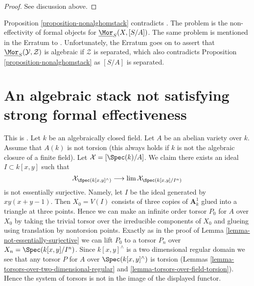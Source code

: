 \begin{proof}
See discussion above.
\end{proof}

\begin{remark}
\label{remark-contradict-aoki}
Proposition \ref{proposition-nonalghomstack} contradicts
\cite[Theorem 1.1]{AokiHomStacks}. The problem is the non-effectivity
of formal objects for $\underline{\Mor}_S(X, [S/A])$. The same problem
is mentioned in the Erratum \cite{AokiHomStacksErr} to
\cite{AokiHomStacks}. Unfortunately, the Erratum goes on
to assert that $\underline{\Mor}_S(\mathcal{Y}, \mathcal{Z})$
is algebraic if $\mathcal{Z}$ is separated, which also contradicts
Proposition \ref{proposition-nonalghomstack} as $[S/A]$ is separated.
\end{remark}








\section{An algebraic stack not satisfying strong formal effectiveness}
\label{section-non-formal-effectiveness}

\noindent
This is \cite[Example 4.12]{Bhatt-Algebraize}.
Let $k$ be an algebraically closed field.
Let $A$ be an abelian variety over $k$.
Assume that $A(k)$ is not torsion (this always holds if $k$
is not the algebraic closure of a finite field).
Let $\mathcal{X} = [\Spec(k)/A]$.
We claim there exists an ideal $I \subset k[x, y]$
such that
$$
\mathcal{X}_{\Spec(k[x, y]^\wedge)}
\longrightarrow
\lim \mathcal{X}_{\Spec(k[x, y]/I^n)}
$$
is not essentially surjective. Namely, let $I$
be the ideal generated by $xy(x + y - 1)$.
Then $X_0 = V(I)$ consists of three copies of $\mathbf{A}^1_k$
glued into a triangle at three points. Hence we can make an infinite order
torsor $P_0$ for $A$ over $X_0$ by taking the trivial torsor
over the irreducible components of $X_0$ and glueing
using translation by nontorsion points.
Exactly as in the proof of Lemma \ref{lemma-not-essentially-surjective}
we can lift $P_0$ to a torsor $P_n$ over $X_n = \Spec(k[x, y]/I^n)$.
Since $k[x, y]^\wedge$ is a two dimensional regular domain
we see that any torsor $P$ for $A$ over $\Spec(k[x, y]^\wedge)$
is torsion (Lemmas \ref{lemma-torsors-over-two-dimensional-regular}
and \ref{lemma-torsors-over-field-torsion}). Hence the system of
torsors is not in the image of the displayed functor.

